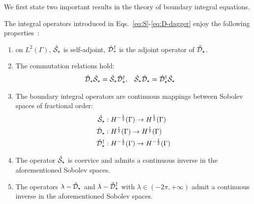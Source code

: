 We first state two important results in the theory of boundary integral
equations.
\begin{lemma}
  The integral operators introduced in Eqs.~\eqref{eq:S}-\eqref{eq:D-dagger}
  enjoy the following properties~\autocite{Hsiao2008-xb, Sauter2011-an}:
  \begin{enumerate}
      \item on $L^2(\Gamma)$, $\hat{\mathcal{S}}_\star$ is self-adjoint,
        $\hat{\mathcal{D}}^\dagger_\star$ is the adjoint operator of
        $\hat{\mathcal{D}}_\star$.
      \item The commutation relations hold:
        \begin{alignat}{2}
          \hat{\mathcal{D}}_\star\hat{\mathcal{S}}_\star = \hat{\mathcal{S}}_\star\hat{\mathcal{D}}^\dagger_\star, \quad&
          \hat{\mathcal{S}}_\star\hat{\mathcal{D}}_\star = \hat{\mathcal{D}}^\dagger_\star\hat{\mathcal{S}}_\star
        \end{alignat}
      \item The boundary integral operators are continuous
        mappings between Sobolev spaces of fractional order:
        \begin{subequations}
          \begin{align}
   \hat{\mathcal{S}}_\star &: H^{-\frac{1}{2}}(\Gamma) \rightarrow H^{\frac{1}{2}}(\Gamma) \\
   \hat{\mathcal{D}}_\star &: H^{\frac{1}{2}}(\Gamma) \rightarrow H^{\frac{1}{2}}(\Gamma) \\
   \hat{\mathcal{D}}^\dagger_\star &: H^{-\frac{1}{2}}(\Gamma) \rightarrow H^{-\frac{1}{2}}(\Gamma)
          \end{align}
        \end{subequations}
      \item The operator $\hat{\mathcal{S}}_\star$ is coervice and admits a
        continuous inverse in the aforementioned Sobolev spaces.
      \item The operators $\lambda - \hat{\mathcal{D}}_\star$ and $\lambda -
        \hat{\mathcal{D}}^\dagger_\star$ with $\lambda \in (-2\pi, +\infty)$
        admit a continuous inverse in the aforementioned
        Sobolev spaces.
  \end{enumerate}
\end{lemma}

